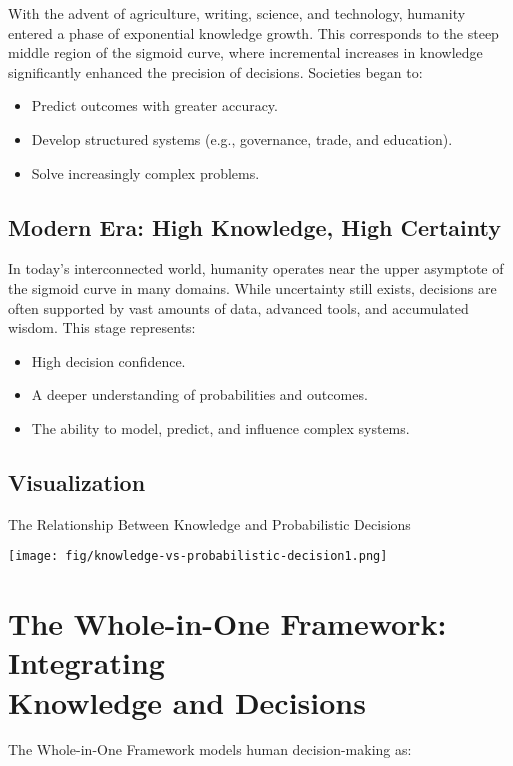 \documentclass[a4]{article}
\begin{document}
With the advent of agriculture, writing, science, and technology, humanity entered a phase of exponential knowledge growth. This corresponds to the steep middle region of the sigmoid curve, where incremental increases in knowledge significantly enhanced the precision of decisions. Societies began to:

\begin{itemize}
\item  Predict outcomes with greater accuracy.
\item Develop structured systems (e.g., governance, trade, and education).
\item Solve increasingly complex problems.
\end{itemize}

\subsection{Modern Era: High Knowledge, High Certainty}

In today's interconnected world, humanity operates near the upper asymptote of the sigmoid curve in many domains. While uncertainty still exists, decisions are often supported by vast amounts of data, advanced tools, and accumulated wisdom. This stage represents:

\begin{itemize}
\item  High decision confidence.
\item A deeper understanding of probabilities and outcomes.
\item The ability to model, predict, and influence complex systems.
\end{itemize}

\pagebreak
\subsection{Visualization}
The Relationship Between Knowledge and Probabilistic Decisions
\begin{center}
\texttt{[image: fig/knowledge-vs-probabilistic-decision1.png]}
\end{center}

\section{The Whole-in-One Framework: Integrating\\ Knowledge and Decisions}

The Whole-in-One Framework models human decision-making as:
\end{document}
